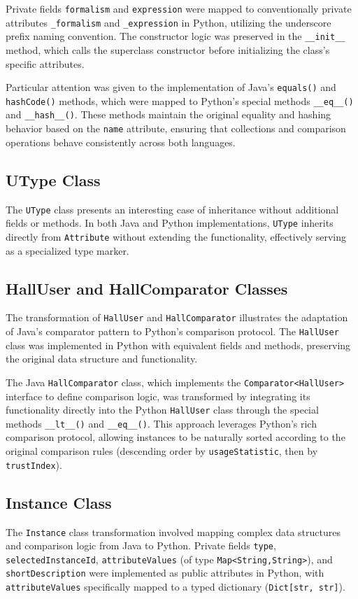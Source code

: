 \documentclass[12pt,a4paper]{article}
\begin{document}
Private fields \texttt{formalism} and \texttt{expression} were mapped to conventionally private attributes \texttt{\_formalism} and \texttt{\_expression} in Python, utilizing the underscore prefix naming convention. The constructor logic was preserved in the \texttt{\_\_init\_\_} method, which calls the superclass constructor before initializing the class's specific attributes.

Particular attention was given to the implementation of Java's \texttt{equals()} and \texttt{hashCode()} methods, which were mapped to Python's special methods \texttt{\_\_eq\_\_()} and \texttt{\_\_hash\_\_()}. These methods maintain the original equality and hashing behavior based on the \texttt{name} attribute, ensuring that collections and comparison operations behave consistently across both languages.

\subsection{UType Class}
The \texttt{UType} class presents an interesting case of inheritance without additional fields or methods. In both Java and Python implementations, \texttt{UType} inherits directly from \texttt{Attribute} without extending the functionality, effectively serving as a specialized type marker.


\subsection{HallUser and HallComparator Classes}
The transformation of \texttt{HallUser} and \texttt{HallComparator} illustrates the adaptation of Java's comparator pattern to Python's comparison protocol. The \texttt{HallUser} class was implemented in Python with equivalent fields and methods, preserving the original data structure and functionality.

The Java \texttt{HallComparator} class, which implements the \texttt{Comparator<HallUser>} interface to define comparison logic, was transformed by integrating its functionality directly into the Python \texttt{HallUser} class through the special methods \texttt{\_\_lt\_\_()} and \texttt{\_\_eq\_\_()}. This approach leverages Python's rich comparison protocol, allowing instances to be naturally sorted according to the original comparison rules (descending order by \texttt{usageStatistic}, then by \texttt{trustIndex}).


\subsection{Instance Class}
The \texttt{Instance} class transformation involved mapping complex data structures and comparison logic from Java to Python. Private fields \texttt{type}, \texttt{selectedInstanceId}, \texttt{attributeValues} (of type \texttt{Map<String,String>}), and \texttt{shortDescription} were implemented as public attributes in Python, with \texttt{attributeValues} specifically mapped to a typed dictionary (\texttt{Dict[str, str]}).
\end{document}
